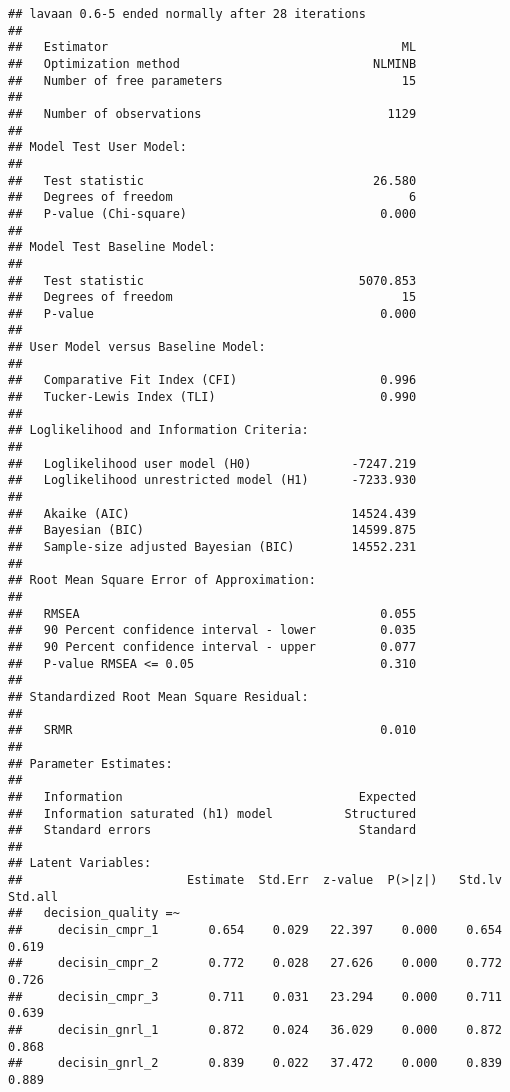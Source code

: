\documentclass[]{article}
\begin{document}
\begin{verbatim}
## lavaan 0.6-5 ended normally after 28 iterations
## 
##   Estimator                                         ML
##   Optimization method                           NLMINB
##   Number of free parameters                         15
##                                                       
##   Number of observations                          1129
##                                                       
## Model Test User Model:
##                                                       
##   Test statistic                                26.580
##   Degrees of freedom                                 6
##   P-value (Chi-square)                           0.000
## 
## Model Test Baseline Model:
## 
##   Test statistic                              5070.853
##   Degrees of freedom                                15
##   P-value                                        0.000
## 
## User Model versus Baseline Model:
## 
##   Comparative Fit Index (CFI)                    0.996
##   Tucker-Lewis Index (TLI)                       0.990
## 
## Loglikelihood and Information Criteria:
## 
##   Loglikelihood user model (H0)              -7247.219
##   Loglikelihood unrestricted model (H1)      -7233.930
##                                                       
##   Akaike (AIC)                               14524.439
##   Bayesian (BIC)                             14599.875
##   Sample-size adjusted Bayesian (BIC)        14552.231
## 
## Root Mean Square Error of Approximation:
## 
##   RMSEA                                          0.055
##   90 Percent confidence interval - lower         0.035
##   90 Percent confidence interval - upper         0.077
##   P-value RMSEA <= 0.05                          0.310
## 
## Standardized Root Mean Square Residual:
## 
##   SRMR                                           0.010
## 
## Parameter Estimates:
## 
##   Information                                 Expected
##   Information saturated (h1) model          Structured
##   Standard errors                             Standard
## 
## Latent Variables:
##                       Estimate  Std.Err  z-value  P(>|z|)   Std.lv  Std.all
##   decision_quality =~                                                      
##     decisin_cmpr_1       0.654    0.029   22.397    0.000    0.654    0.619
##     decisin_cmpr_2       0.772    0.028   27.626    0.000    0.772    0.726
##     decisin_cmpr_3       0.711    0.031   23.294    0.000    0.711    0.639
##     decisin_gnrl_1       0.872    0.024   36.029    0.000    0.872    0.868
##     decisin_gnrl_2       0.839    0.022   37.472    0.000    0.839    0.889

\end{verbatim}
\end{document}
